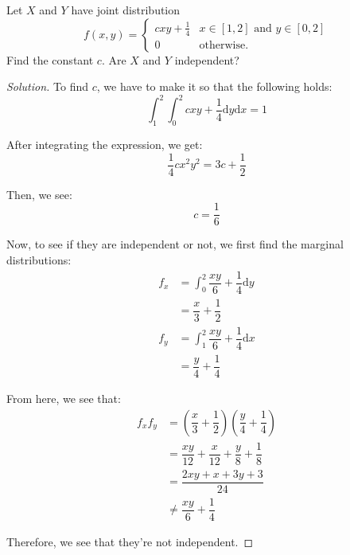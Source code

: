 \documentclass{article}
\newenvironment{solution}{\begin{proof}[Solution]}{\end{proof}}
\begin{document}
\begin{hw}
	Let $X$ and $Y$ have joint distribution 
	\[
	f(x,y) = \begin{cases}
		c x y + \frac{1}{4} & \text{$x \in [1,2]$ and $y \in [0,2]$} \\
		0 & \text{otherwise.}
	\end{cases}
	\]
	Find the constant $c$. Are $X$ and $Y$ independent?
\end{hw}
\begin{solution}
	To find $c$, we have to make it so that the following holds:
	\begin{equation*}
		\int_{1}^{2} \int_{0}^{2} cxy + \dfrac{1}{4} \mathrm{d}y\mathrm{d}x = 1
	\end{equation*}

	After integrating the expression, we get:
	\begin{equation*}
		\dfrac{1}{4}cx^{2}y^{2} = 3c + \dfrac{1}{2}
	\end{equation*}

	Then, we see:
	\begin{equation*}
		c = \dfrac{1}{6}
	\end{equation*}

	Now, to see if they are independent or not, we first find the marginal distributions:
	\begin{align*}
		f_{x} &= \int_{0}^{2} \dfrac{xy}{6} + \dfrac{1}{4} \mathrm{d}y\\
		&= \dfrac{x}{3} + \dfrac{1}{2} \\
		f_{y} &= \int_{1}^{2} \dfrac{xy}{6} + \dfrac{1}{4} \mathrm{d}x\\
		&= \dfrac{y}{4} + \dfrac{1}{4}
	\end{align*}

	From here, we see that:
	\begin{align*}
		f_{x}f_{y} &= \left( \dfrac{x}{3} + \dfrac{1}{2} \right)\left( \dfrac{y}{4} + \dfrac{1}{4} \right) \\
		&= \dfrac{xy}{12} + \dfrac{x}{12} + \dfrac{y}{8} + \dfrac{1}{8} \\
		&= \dfrac{2xy + x + 3y + 3}{24} \\
		&\not= \dfrac{xy}{6} + \dfrac{1}{4}
	\end{align*}
	
	Therefore, we see that they're not independent.
\end{solution}
\end{document}
